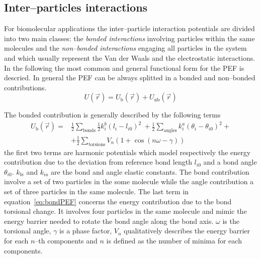 \subsection{Inter--particles interactions}
For biomolecular applications the inter--particle interaction potentials are divided into two main classes: the 
\textit{bonded interactions} involving particles within the same molecules and the \textit{non--bonded 
interactions} engaging all particles in the system and which usually represent the Van der Waals and the 
electrostatic interactions. In the following the most common and general functional form for the \ac{PEF} is descried. In general the \ac{PEF} can be always splitted in a bonded and non--bonded contributions.
\begin{equation*}
	U(\vec r) = U_{\text{b}}(\vec r) + U_\text{nb}(\vec r)
	\label{eq:FFPEF}
\end{equation*}

The bonded contribution is generally described by the following terms
\begin{equation}
	\begin{aligned}
	U_{\text{b}}(\vec r) = &\frac{1}{2}\sum_{\text{bonds}} \frac{1}{2}k_i^b(l_i - l_{i0})^2\ + \frac{1}{2}\sum_{\text{angles}} k_i^a (\theta_i - \theta_{i0})^2 +\\
		 	& +\frac{1}{2}\sum_{\text{torsions}} V_n(1+\cos (n\omega - \gamma))
	\end{aligned}
	\label{eq:bondPEF}
\end{equation} 
the first two terms are harmonic potentials which model respectively the energy contribution due to the deviation 
from reference bond length $l_{i0}$ and a bond angle $\theta_{i0}$. $k_{bi}$ and $k_{ia}$ are the bond and angle 
elastic constants. The bond contribution involve a set of two particles in the some molecule while the angle 
contribution a set of three particles in the same molecule. The last term in equation~\eqref{eq:bondPEF} concerns 
the energy contribution due to the bond torsional change. It involves four particles in the same molecule and 
mimic the energy barrier needed to rotate the bond angle along the bond axis. $\omega$ is the torsional angle, 
$\gamma$ is a phase factor, $V_n$ qualitatively describes the energy barrier for each $n$--th components and $n$ 
is defined as the number of minima for each components.

